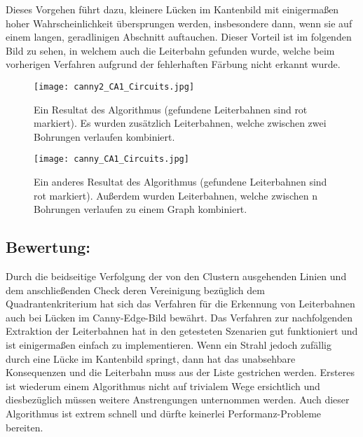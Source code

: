 Dieses Vorgehen führt dazu, kleinere Lücken im Kantenbild mit einigermaßen hoher Wahrscheinlichkeit übersprungen werden, insbesondere dann, wenn sie auf einem langen, geradlinigen Abschnitt auftauchen. Dieser Vorteil ist im folgenden Bild zu sehen, in welchem auch die Leiterbahn gefunden wurde, welche beim vorherigen Verfahren aufgrund der fehlerhaften Färbung nicht erkannt wurde.

\begin{figure}[H]
  \begin{center}
    \texttt{[image: canny2\_CA1\_Circuits.jpg]}
    \caption{Ein Resultat des Algorithmus (gefundene Leiterbahnen sind rot markiert). Es wurden zusätzlich Leiterbahnen, welche zwischen zwei Bohrungen verlaufen kombiniert.}
    \label{fig:linepoints2}
  \end{center}
\end{figure}

\begin{figure}[H]
  \begin{center}
    \texttt{[image: canny\_CA1\_Circuits.jpg]}
    \caption{Ein anderes Resultat des Algorithmus (gefundene Leiterbahnen sind rot markiert). Außerdem wurden Leiterbahnen, welche zwischen n Bohrungen verlaufen zu einem Graph kombiniert.}
    \label{fig:linepoints22}
  \end{center}
\end{figure}

\subsection{Bewertung:}
Durch die beidseitige Verfolgung der von den Clustern ausgehenden Linien und dem anschließenden Check deren Vereinigung bezüglich dem Quadrantenkriterium hat sich das Verfahren für die Erkennung von Leiterbahnen auch bei Lücken im Canny-Edge-Bild bewährt. \newline
Das Verfahren zur nachfolgenden Extraktion der Leiterbahnen hat in den getesteten Szenarien gut funktioniert und ist einigermaßen einfach zu implementieren. \newline
Wenn ein Strahl jedoch zufällig durch eine Lücke im Kantenbild springt, dann hat das unabsehbare Konsequenzen und die Leiterbahn muss aus der Liste gestrichen werden. Ersteres ist wiederum einem Algorithmus nicht auf trivialem Wege ersichtlich und diesbezüglich müssen weitere Anstrengungen unternommen werden. \newline
Auch dieser Algorithmus ist extrem schnell und dürfte keinerlei Performanz-Probleme bereiten. 
